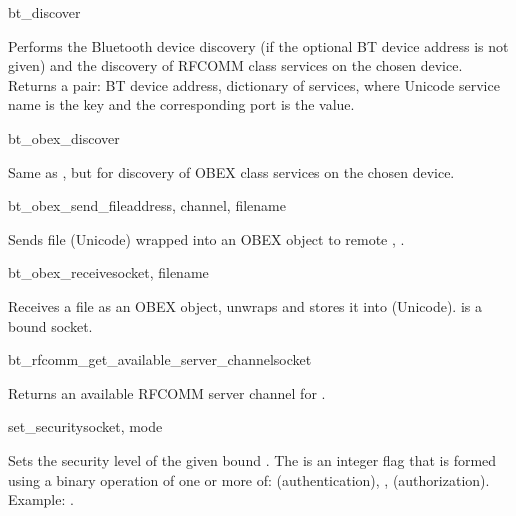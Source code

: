 \begin{funcdesc}{bt_discover}{}

Performs the Bluetooth device discovery (if the optional BT device address 
is not given) and the discovery of RFCOMM class services on the chosen 
device. Returns a pair: BT device address, dictionary of services, where 
Unicode service name is the key and the corresponding port is the value.

\end{funcdesc}

\begin{funcdesc}{bt_obex_discover}{}

Same as , but for discovery of OBEX class services on the 
chosen device.

\end{funcdesc}

\begin{funcdesc}{bt_obex_send_file}{address, channel, filename}

Sends file  (Unicode) wrapped into an OBEX object 
to remote , .

\end{funcdesc}

\begin{funcdesc}{bt_obex_receive}{socket, filename}

Receives a file as an OBEX object, unwraps and stores it into  
(Unicode).  is a bound  socket.

\end{funcdesc}

\begin{funcdesc}{bt_rfcomm_get_available_server_channel}{socket}

Returns an available RFCOMM server channel for .

\end{funcdesc}

\begin{funcdesc}{set_security}{socket, mode}

Sets the security level of the given bound . The 
 is an integer flag that is formed using a binary 
 operation of one or more of:  (authentication), 
,  (authorization). Example: 
.

\end{funcdesc}

